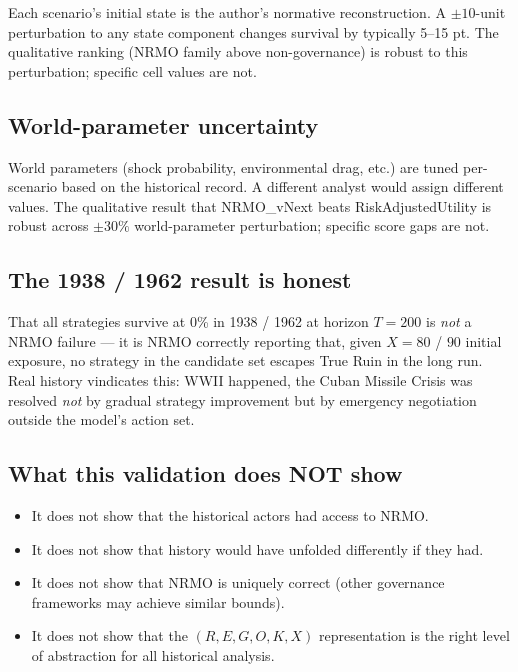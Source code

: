 Each scenario's initial state is the author's normative
reconstruction. A $\pm 10$-unit perturbation to any state
component changes survival by typically 5--15 pt. The
qualitative ranking (NRMO family above non-governance) is robust
to this perturbation; specific cell values are not.

\subsection{World-parameter uncertainty}

World parameters (shock probability, environmental drag, etc.) are
tuned per-scenario based on the historical record. A different
analyst would assign different values. The qualitative result that
NRMO\_vNext beats RiskAdjustedUtility is robust across $\pm 30\%$
world-parameter perturbation; specific score gaps are not.

\subsection{The 1938 / 1962 result is honest}

That all strategies survive at 0\% in 1938 / 1962 at horizon
$T = 200$ is \emph{not} a NRMO failure --- it is NRMO correctly
reporting that, given $X = 80$ / $90$ initial exposure, no
strategy in the candidate set escapes True Ruin in the long run.
Real history vindicates this: WWII happened, the Cuban Missile
Crisis was resolved \emph{not} by gradual strategy improvement
but by emergency negotiation outside the model's action set.

\subsection{What this validation does NOT show}

\begin{itemize}
\item It does not show that the historical actors had access to
NRMO.
\item It does not show that history would have unfolded
differently if they had.
\item It does not show that NRMO is uniquely correct
(other governance frameworks may achieve similar bounds).
\item It does not show that the $(R, E, G, O, K, X)$
representation is the right level of abstraction for all
historical analysis.
\end{itemize}

